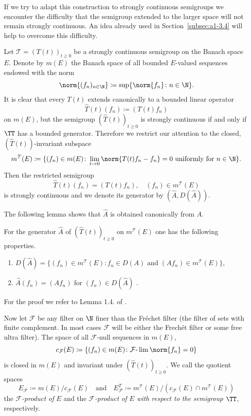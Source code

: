 If we try to adapt this construction to strongly continuous semigroups we encounter the difficulty that the semigroup extended to the larger space will not remain strongly continuous.
An idea already used in Section~\ref{subsec:a1-3.4} will help to overcome this difficulty.

Let $\mathcal{T} = (T(t))_{t \geq 0}$ be a strongly continuous semigroup on the Banach space $E$.
Denote by $m(E)$ the Banach space of all bounded $E$-valued sequences endowed with the norm
\[
    \norm{(f_{n})_{n \in \N}} \coloneqq \sup \{\norm{f_{n}} \colon n \in \N\} .
\]
It is clear that every $T(t)$ extends canonically to a bounded linear operator
\[
    \widehat{T}(t)(f_{n}) \coloneqq (T(t)f_{n})
\]
on $m(E)$, but the semigroup $(\widehat{T}(t))_{t \geq 0}$ is strongly continuous if and only if\/ $\TT$ has a bounded generator.
Therefore we restrict our attention to the closed, $(\widehat{T}(t))$-invariant subspace
\[
    m^{\mathcal{T}}(E) \coloneqq \{(f_{n}) \in m(E) \colon \lim_{t \to 0} \norm{T(t)f_{n}-f_{n}} = 0 \text{ uniformly for } n \in \N\} .
\]
Then the restricted semigroup
\[
    \widehat{T}(t)(f_{n}) = (T(t)f_{n}), \quad (f_{n}) \in m^{\mathcal{T}}(E)
\]
is strongly continuous and we denote its generator by $(\widehat{A},D(\widehat{A}))$.

The following lemma shows that $\widehat{A}$ is obtained canonically from $A$.
\begin{lemma*}\label{lem:a1-3.6}
For the generator $\widehat{A}$ of\/ $(\widehat{T}(t))_{t \geq 0}$ on $m^{\mathcal{T}}(E)$ one has the following properties.
\begin{enumerate}[\upshape(i)]

\item 
$D(\widehat{A}) = \{(f_{n}) \in m^{\mathcal{T}}(E) \colon f_{n} \in D(A) \text{ and } (Af_{n}) \in m^{\mathcal{T}}(E)\}$,

\item 
$\widehat{A}(f_{n}) = (Af_{n})$ for $(f_{n}) \in D(\widehat{A})$ .
\end{enumerate}

\end{lemma*}
For the proof we refer to Lemma 1.4. of \textcite{derndinger:1980}.

Now let $\mathcal{F}$ be any filter on $\N$ finer than the Fréchet filter (\ie the filter of sets with finite complement. In most cases $\mathcal{F}$ will be either the Frechét filter or some free ultra filter).
The space of all $\mathcal{F}$-null sequences in $m(E)$, \ie
\[
    c_{\mathcal{F}}(E) \coloneqq \{(f_{n}) \in m(E) \colon \mathcal{F}\text{-}\lim\norm{f_{n}} = 0\}
\]
is closed in $m(E)$ and invariant under $(\widehat{T}(t))_{t \geq 0}$. 
We call the quotient spaces
\[
    E_{\mathcal{F}} \coloneqq m(E)/c_{\mathcal{F}}(E) 
    \quad \text{and} \quad 
    E_{\mathcal{F}}^{T} \coloneqq m^{\mathcal{T}}(E)/ (c_{\mathcal{F}}(E)\cap m^{\mathcal{T}}(E))
\]
the \emph{$\mathcal{F}$-product of\/ $E$} and the \emph{$ \mathcal{F} $-product of\/ $E$ with respect to the semigroup $\TT$}, respectively.

